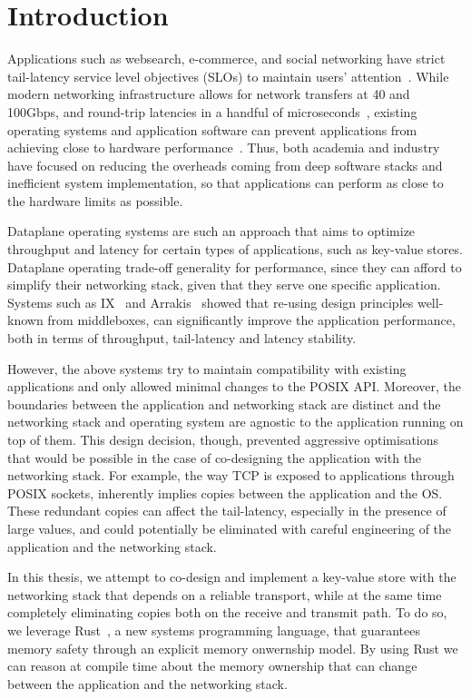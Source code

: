 \chapter{Introduction}

Applications such as websearch, e-commerce, and social networking have
strict tail-latency service level objectives (SLOs) to maintain users'
attention~\cite{url:attention}.
While modern networking infrastructure allows for network transfers at
40 and 100Gbps, and round-trip latencies in a handful of
microseconds~\cite{XXX}, existing operating systems and application
software can prevent applications from achieving close to hardware
performance~\cite{ix}.
Thus, both academia and industry have focused on reducing the
overheads coming from deep software stacks and inefficient system
implementation, so that applications can perform as close to the hardware
limits as possible.

Dataplane operating systems are such an approach that aims to optimize
throughput and latency for certain types of applications, such as
key-value stores.
Dataplane operating trade-off generality for performance, since they
can afford to simplify their networking stack, given that they serve
one specific application.
Systems such as IX~\cite{ix} and Arrakis~\cite{arrakis} showed that
re-using design principles well-known from middleboxes, can
significantly improve the application performance,
both in terms of throughput, tail-latency and latency stability.

However, the above systems try to maintain compatibility with
existing applications and only allowed minimal changes to the POSIX
API.
Moreover, the boundaries between the application and networking stack are distinct
and the networking stack and operating system are agnostic to the application running on top of them.
This design decision, though, prevented aggressive optimisations
that would be possible in the case of co-designing the application
with the networking stack.
For example, the way TCP is exposed to applications through POSIX
sockets, inherently implies copies between the application and the
OS.
These redundant copies can affect the tail-latency, especially in the presence of large values,
and could potentially be eliminated with careful engineering of the application and the networking stack.

In this thesis, we attempt to co-design and implement a key-value
store with the networking stack that depends on a reliable transport,
while at the same time completely eliminating copies both on the
receive and transmit path.
To do so, we leverage Rust~\cite{rust}, a new systems programming language, that
guarantees memory safety through an explicit memory onwernship model.
By using Rust we can reason at compile time about the memory ownership
that can change between the application and the networking stack.


